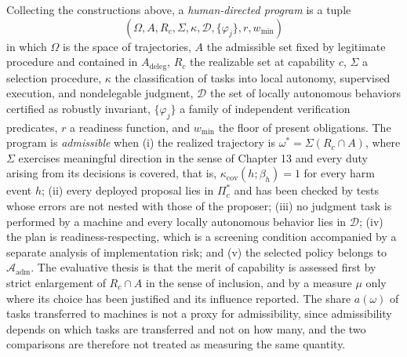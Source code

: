 Collecting the constructions above, a \emph{human-directed program} is a tuple\[(\Omega,A,R_c,\Sigma,\kappa,\mathcal{D},\{\varphi_j\},r,w_{\min})\]in which $\Omega$ is the space of trajectories, $A$ the admissible set fixed by legitimate procedure and contained in $A_{\mathrm{deleg}}$, $R_c$ the realizable set at capability $c$, $\Sigma$ a selection procedure, $\kappa$ the classification of tasks into local autonomy, supervised execution, and nondelegable judgment, $\mathcal{D}$ the set of locally autonomous behaviors certified as robustly invariant, $\{\varphi_j\}$ a family of independent verification predicates, $r$ a readiness function, and $w_{\min}$ the floor of present obligations. The program is \emph{admissible} when (i) the realized trajectory is $\omega^\ast=\Sigma(R_c\cap A)$, where $\Sigma$ exercises meaningful direction in the sense of Chapter 13 and every duty arising from its decisions is covered, that is, $\kappa_{\mathrm{cov}}(h;\beta_h)=1$ for every harm event $h$; (ii) every deployed proposal lies in $\Pi_c^\ast$ and has been checked by tests whose errors are not nested with those of the proposer; (iii) no judgment task is performed by a machine and every locally autonomous behavior lies in $\mathcal{D}$; (iv) the plan is readiness-respecting, which is a screening condition accompanied by a separate analysis of implementation risk; and (v) the selected policy belongs to $\mathcal{A}_{\mathrm{adm}}$. The evaluative thesis is that the merit of capability is assessed first by strict enlargement of $R_c\cap A$ in the sense of inclusion, and by a measure $\mu$ only where its choice has been justified and its influence reported. The share $a(\omega)$ of tasks transferred to machines is not a proxy for admissibility, since admissibility depends on which tasks are transferred and not on how many, and the two comparisons are therefore not treated as measuring the same quantity.
